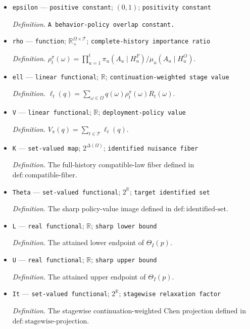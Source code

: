 \documentclass{article}
\begin{document}
\begin{itemize}
  \item \texttt{epsilon} --- \texttt{positive constant}; \((0,1)\); \texttt{positivity constant}
  \par\smallskip\noindent\emph{Definition.} \texttt{A behavior-\allowbreak{}policy overlap constant.}
  \item \texttt{rho} --- \texttt{function}; \(\mathbb R_+^{\Omega\times\mathcal T}\); \texttt{complete-\allowbreak{}history importance ratio}
  \par\smallskip\noindent\emph{Definition.} \(\rho_t^\pi(\omega)=\prod_{u=1}^t \pi_u(A_u\mid H_u^F)/\mu_u(A_u\mid H_u^O)\).
  \item \texttt{ell} --- \texttt{linear functional}; \(\mathbb R\); \texttt{continuation-\allowbreak{}weighted stage value}
  \par\smallskip\noindent\emph{Definition.} \(\ell_t(q)=\sum_{\omega\in\Omega}q(\omega)\rho_t^\pi(\omega)R_t(\omega)\).
  \item \texttt{V} --- \texttt{linear functional}; \(\mathbb R\); \texttt{deployment-\allowbreak{}policy value}
  \par\smallskip\noindent\emph{Definition.} \(V_\pi(q)=\sum_{t\in\mathcal T}\ell_t(q)\).
  \item \texttt{K} --- \texttt{set-\allowbreak{}valued map}; \(2^{\Delta(\Omega)}\); \texttt{identified nuisance fiber}
  \par\smallskip\noindent\emph{Definition.} The full-history compatible-law fiber defined in \(\mathrm{def{:}compatible\text{-}fiber}\).
  \item \texttt{Theta} --- \texttt{set-\allowbreak{}valued functional}; \(2^{\mathbb R}\); \texttt{target identified set}
  \par\smallskip\noindent\emph{Definition.} The sharp policy-value image defined in \(\mathrm{def{:}identified\text{-}set}\).
  \item \texttt{L} --- \texttt{real functional}; \(\mathbb R\); \texttt{sharp lower bound}
  \par\smallskip\noindent\emph{Definition.} The attained lower endpoint of \(\Theta_I(p)\).
  \item \texttt{U} --- \texttt{real functional}; \(\mathbb R\); \texttt{sharp upper bound}
  \par\smallskip\noindent\emph{Definition.} The attained upper endpoint of \(\Theta_I(p)\).
  \item \texttt{It} --- \texttt{set-\allowbreak{}valued functional}; \(2^{\mathbb R}\); \texttt{stagewise relaxation factor}
  \par\smallskip\noindent\emph{Definition.} The stagewise continuation-weighted Chen projection defined in \(\mathrm{def{:}stagewise\text{-}projection}\).

\end{itemize}
\end{document}
